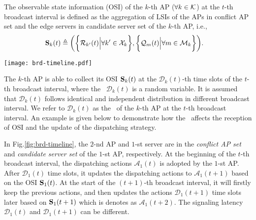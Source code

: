 \begin{definition}
    The observable state information (OSI) of the $k$-th AP ($\forall k\in\mathcal{K}$) at the $t$-th broadcast interval is defined as the aggregation of LSIs of the APs in {conflict AP set} and the edge servers in {candidate server set} of the $k$-th AP, i.e.,
    \begin{align}
        \mathbf{S}_{k}(t) &\triangleq
        \bigg(
            \bigg\{\mathcal{R}_{k'}(t) \Big| \forall k'\in\mathcal{X}_{k}\bigg\},
            \bigg\{\mathcal{Q}_{m}(t) \Big| \forall m\in\mathcal{M}_{k}\bigg\}
        \bigg).
    \end{align}
    \label{def:OSI}
\end{definition}

\begin{figure*}[t]
    \centering
    \texttt{[image: brd-timeline.pdf]}
    \caption{The timeline illustration of reception of OSI for the $1$-st AP where $2$-nd AP is in its \emph{conflict AP set} and $1$-st server is in its \emph{candidate server set}.}
    \label{fig:brd-timeline}
\end{figure*}

The $k$-th AP is able to collect its OSI $\mathbf{S}_{k}(t)$ at the $\mathcal{D}_{k}(t)$-th time slots of the $t$-th broadcast interval, where the \brlatency~$\mathcal{D}_{k}(t)$ is a random variable.
It is assumed that $\mathcal{D}_{k}(t)$ follows identical and independent distribution in different broadcast interval.
We refer to $\mathcal{D}_{k}(t)$ as the \brlatency~of the $k$-th AP at the $t$-th broadcast interval.
An example is given below to demonstrate how the \brlatency~affects the reception of OSI and the update of the dispatching strategy.

\begin{example}
    In Fig.\ref{fig:brd-timeline}, the $2$-nd AP and $1$-st server are in the \emph{conflict AP set} and \emph{candidate server set} of the $1$-st AP, respectively.
    At the beginning of the $t$-th broadcast interval, the dispatching actions $\mathcal{A}_{1}(t)$ is adopted by the $1$-st AP.
    After $\mathcal{D}_{1}(t)$ time slots, it updates the dispatching actions to $\mathcal{A}_{1}(t+1)$ based on the OSI $\mathbf{S}_{1}(t)$.
    At the start of the $(t+1)$-th broadcast interval, it will firstly keep the previous actions, and then updates the actions $\mathcal{D}_{1}(t+1)$ time slots later based on $\mathbf{S}_{1}(t+1)$ which is denotes as $\mathcal{A}_{1}(t+2)$.
    The signaling latency $\mathcal{D}_1(t)$ and $\mathcal{D}_1(t+1)$ can be different.
\end{example}
